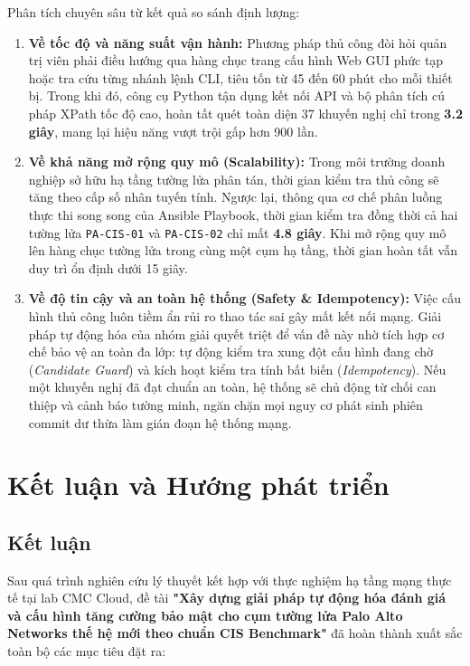 \documentclass[12pt,a4paper]{article}
\begin{document}
\noindent Phân tích chuyên sâu từ kết quả so sánh định lượng:
\begin{enumerate}
    \item \textbf{Về tốc độ và năng suất vận hành:} Phương pháp thủ công đòi hỏi quản trị viên phải điều hướng qua hàng chục trang cấu hình Web GUI phức tạp hoặc tra cứu từng nhánh lệnh CLI, tiêu tốn từ 45 đến 60 phút cho mỗi thiết bị. Trong khi đó, công cụ Python tận dụng kết nối API và bộ phân tích cú pháp XPath tốc độ cao, hoàn tất quét toàn diện 37 khuyến nghị chỉ trong \textbf{3.2 giây}, mang lại hiệu năng vượt trội gấp hơn 900 lần.
    \item \textbf{Về khả năng mở rộng quy mô (Scalability):} Trong môi trường doanh nghiệp sở hữu hạ tầng tường lửa phân tán, thời gian kiểm tra thủ công sẽ tăng theo cấp số nhân tuyến tính. Ngược lại, thông qua cơ chế phân luồng thực thi song song của Ansible Playbook, thời gian kiểm tra đồng thời cả hai tường lửa \texttt{PA-CIS-01} và \texttt{PA-CIS-02} chỉ mất \textbf{4.8 giây}. Khi mở rộng quy mô lên hàng chục tường lửa trong cùng một cụm hạ tầng, thời gian hoàn tất vẫn duy trì ổn định dưới 15 giây.
    \item \textbf{Về độ tin cậy và an toàn hệ thống (Safety \& Idempotency):} Việc cấu hình thủ công luôn tiềm ẩn rủi ro thao tác sai gây mất kết nối mạng. Giải pháp tự động hóa của nhóm giải quyết triệt để vấn đề này nhờ tích hợp cơ chế bảo vệ an toàn đa lớp: tự động kiểm tra xung đột cấu hình đang chờ (\textit{Candidate Guard}) và kích hoạt kiểm tra tính bất biến (\textit{Idempotency}). Nếu một khuyến nghị đã đạt chuẩn an toàn, hệ thống sẽ chủ động từ chối can thiệp và cảnh báo tường minh, ngăn chặn mọi nguy cơ phát sinh phiên commit dư thừa làm gián đoạn hệ thống mạng.
\end{enumerate}

\section{Kết luận và Hướng phát triển}

\subsection{Kết luận}
\noindent Sau quá trình nghiên cứu lý thuyết kết hợp với thực nghiệm hạ tầng mạng thực tế tại lab CMC Cloud, đề tài \textbf{"Xây dựng giải pháp tự động hóa đánh giá và cấu hình tăng cường bảo mật cho cụm tường lửa Palo Alto Networks thế hệ mới theo chuẩn CIS Benchmark"} đã hoàn thành xuất sắc toàn bộ các mục tiêu đặt ra:
\end{document}
